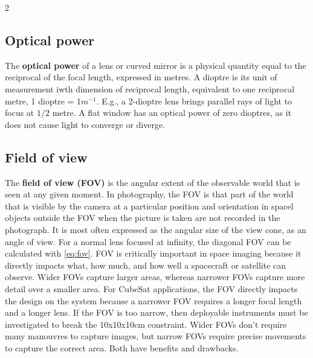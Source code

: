 \documentclass[10pt]{article}
\begin{document}
\begin{multicols}{2}
\subsection{Optical power}

The \textbf{optical power} of a lens or curved mirror is a physical quantity equal to the reciprocal of the focal length, expressed in metres. A dioptre is its unit of measurement iwth dimension of reciprocal length, equivalent to one reciprocal metre, 1 dioptre = 1$m^{-1}$. E.g., a 2-dioptre lens brings parallel rays of light to focus at $1/2$ metre. A flat window has an optical power of zero dioptres, as it does not cause light to converge or diverge.

\subsection{Field of view}
The \textbf{field of view (FOV)} is the angular extent of the observable world that is seen at any given moment. In photography, the FOV is that part of the world that is visible by the camera at a particular position and orientation in spacel objects outside the FOV when the picture is taken are not recorded in the photograph. It is most often expressed as the angular size of the view cone, as an angle of view. For a normal lens focused at infinity, the diagonal FOV can be calculated with \ref{eq:fov}.
\newline \newline
FOV is critically important in space imaging because it directly impacts what, how much, and how well a spacecraft or satellite can observe. Wider FOVs capture larger areas, whereas narrower FOVs capture more detail over a smaller area. For CubeSat applications, the FOV directly impacts the design on the system because a narrower FOV requires a longer focal length and a longer lens. If the FOV is too narrow, then deployable instruments must be investigated to break the 10x10x10cm constraint.
Wider FOVs don't require many manouvres to capture images, but narrow FOVs require precise movements to capture the correct area. Both have benefits and drawbacks.


\end{multicols}
\end{document}
